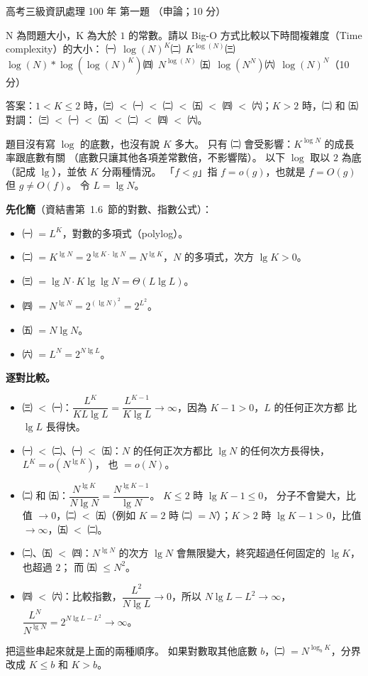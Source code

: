 \begin{pastexam}[label={px:gk3-100-ds-01}]{高考三級資訊處理 100 年 第一題}
（申論；10 分）

N 為問題大小，K 為大於 $1$ 的常數。請以 Big-O 方式比較以下時間複雜度（Time complexity）的大小：
㈠~$\log(N)^{K}$\quad ㈡~$K^{\log(N)}$\quad ㈢~$\log(N)*\log(\log(N)^{K})$\quad ㈣~$N^{\log(N)}$\quad
㈤~$\log(N^{N})$\quad ㈥~$\log(N)^{N}$（10 分）
\end{pastexam}

\begin{pastsoln}
答案：$1 < K \le 2$ 時，㈢ $<$ ㈠ $<$ ㈡ $<$ ㈤ $<$ ㈣ $<$ ㈥；$K > 2$ 時，㈡ 和 ㈤ 對調：
㈢ $<$ ㈠ $<$ ㈤ $<$ ㈡ $<$ ㈣ $<$ ㈥。

題目沒有寫 $\log$ 的底數，也沒有說 $K$ 多大。 只有 ㈡ 會受影響：$K^{\log N}$ 的成長率跟底數有關
（底數只讓其他各項差常數倍，不影響階）。 以下 $\log$ 取以 $2$ 為底（記成 $\lg$），並依 $K$ 分兩種情況。
「$f < g$」指 $f = o(g)$，也就是 $f = O(g)$ 但 $g \ne O(f)$。 令 $L = \lg N$。

\textbf{先化簡}（資結書第~1.6~節的對數、指數公式）：
\begin{itemize}
\item ㈠ $= L^{K}$，對數的多項式（polylog）。
\item ㈡ $= K^{\lg N} = 2^{\lg K \cdot \lg N} = N^{\lg K}$，$N$ 的多項式，次方 $\lg K > 0$。
\item ㈢ $= \lg N \cdot K \lg\lg N = \Theta(L \lg L)$。
\item ㈣ $= N^{\lg N} = 2^{(\lg N)^{2}} = 2^{L^{2}}$。
\item ㈤ $= N \lg N$。
\item ㈥ $= L^{N} = 2^{N \lg L}$。
\end{itemize}

\textbf{逐對比較。}
\begin{itemize}
\item ㈢ $<$ ㈠：$\dfrac{L^{K}}{K L \lg L} = \dfrac{L^{K-1}}{K\lg L} \to \infty$，因為 $K - 1 > 0$，$L$ 的任何正次方都
比 $\lg L$ 長得快。
\item ㈠ $<$ ㈡、㈠ $<$ ㈤：$N$ 的任何正次方都比 $\lg N$ 的任何次方長得快，$L^{K} = o(N^{\lg K})$，
也 $= o(N)$。
\item ㈡ 和 ㈤：$\dfrac{N^{\lg K}}{N \lg N} = \dfrac{N^{\lg K - 1}}{\lg N}$。 $K \le 2$ 時 $\lg K - 1 \le 0$，
分子不會變大，比值 $\to 0$，㈡ $<$ ㈤（例如 $K = 2$ 時 ㈡ $= N$）；$K > 2$ 時 $\lg K - 1 > 0$，比值
$\to \infty$，㈤ $<$ ㈡。
\item ㈡、㈤ $<$ ㈣：$N^{\lg N}$ 的次方 $\lg N$ 會無限變大，終究超過任何固定的 $\lg K$，也超過 $2$；
而 ㈤ $\le N^{2}$。
\item ㈣ $<$ ㈥：比較指數，$\dfrac{L^{2}}{N \lg L} \to 0$，所以 $N\lg L - L^{2} \to \infty$，
$\dfrac{L^{N}}{N^{\lg N}} = 2^{N\lg L - L^{2}} \to \infty$。
\end{itemize}

把這些串起來就是上面的兩種順序。 如果對數取其他底數 $b$，㈡ $= N^{\log_b K}$，分界改成
$K \le b$ 和 $K > b$。
\end{pastsoln}
